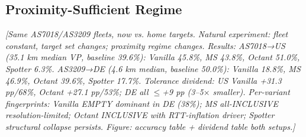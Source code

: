 \subsection{Proximity-Sufficient Regime}
\label{sec:results-proximity-sufficient}
\textit{[Same AS7018/AS3209 fleets, now vs. home targets. Natural experiment: fleet constant,
target set changes; proximity regime changes. Results: AS7018→US (35.1 km median VP, baseline
39.6\%): Vanilla 45.8\%, MS 43.8\%, Octant 51.0\%, Spotter 6.3\%. AS3209→DE (4.6 km median,
baseline 50.0\%): Vanilla 18.8\%, MS 46.9\%, Octant 39.6\%, Spotter 17.7\%. Tolerance dividend:
US Vanilla +31.3 pp/68\%, Octant +27.1 pp/53\%; DE all $\leq$+9 pp (3--5$\times$ smaller).
Per-variant fingerprints: Vanilla EMPTY dominant in DE (38\%); MS all-INCLUSIVE resolution-limited;
Octant INCLUSIVE with RTT-inflation driver; Spotter structural collapse persists.
Figure: accuracy table + dividend table both setups.]}

%
%
%

